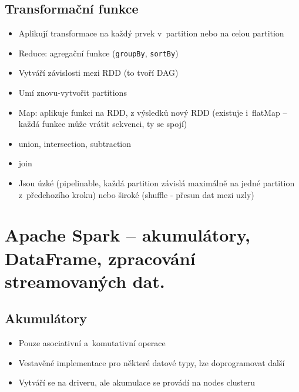 \subsection{Transformační funkce}
\begin{itemize}
    \item Aplikují transformace na každý prvek v~partition nebo na celou partition
    \item Reduce: agregační funkce (\texttt{groupBy}, \texttt{sortBy})
    \item Vytváří závislosti mezi RDD (to tvoří DAG)
    \item Umí znovu-vytvořit partitions
    \item Map: aplikuje funkci na RDD, z výsledků nový RDD (existuje i~flatMap -- každá funkce může vrátit sekvenci, ty se spojí)
    \item union, intersection, subtraction
    \item join
    \item Jsou úzké (pipelinable, každá partition závislá maximálně na jedné partition z~předchozího kroku) nebo široké (shuffle - přesun dat mezi uzly)
\end{itemize}

\section{Apache Spark – akumulátory, DataFrame, zpracování streamovaných dat.}
\subsection{Akumulátory}
\begin{itemize}
    \item Pouze asociativní a~komutativní operace
    \item Vestavěné implementace pro některé datové typy, lze doprogramovat další
    \item Vytváří se na driveru, ale akumulace se provádí na nodes clusteru
\end{itemize}
